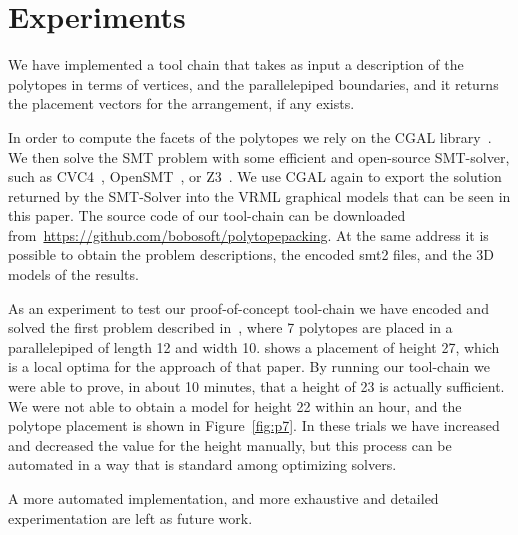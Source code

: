 \section{Experiments}

We have implemented a tool chain that takes as input a description
of the polytopes in terms of vertices, and the parallelepiped boundaries,
and it returns the placement vectors for the arrangement, if any
exists.

In order to compute the facets of the polytopes we rely on the CGAL 
library~\cite{CGAL}. We then solve the SMT problem with some
efficient and open-source SMT-solver, such as CVC4~\cite{CVC4}, OpenSMT~\cite{OpenSMT}, 
or Z3~\cite{Z3}. We use CGAL again
to export the solution returned by the SMT-Solver into the VRML graphical models
that can be seen in this paper. The source code of our tool-chain can 
be downloaded from~\url{https://github.com/bobosoft/polytopepacking}. 
At the same address it is possible to obtain the problem descriptions, the
encoded smt2 files, and the 3D models of the results.

As an experiment to test our proof-of-concept tool-chain we have
encoded and solved the first problem described in~\cite{sto03}, where
7 polytopes are placed in a parallelepiped of length 12 and width 10.
\cite{sto03} shows a placement of height 27, which is a local optima for
the approach of that paper. By running our tool-chain we were able to
prove, in about 10 minutes, that a height of 23 is actually sufficient.
We were not able to obtain a model for height 22 within an hour, and
the polytope placement is shown in Figure~\ref{fig:p7}. In these
trials we have increased and decreased the value for the height manually,
but this process can be automated in a way that is standard among
optimizing solvers.

A more automated implementation, and more exhaustive and detailed 
experimentation are left as future work.


